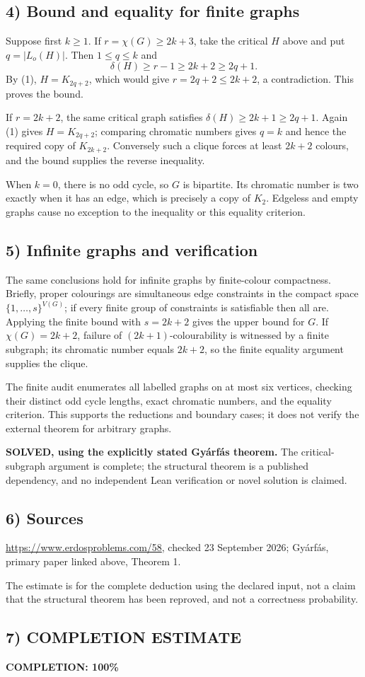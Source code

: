 \subsection*{4) Bound and equality for finite graphs}
Suppose first $k\ge1$. If $r=\chi(G)\ge2k+3$, take the critical $H$ above and put $q=|L_o(H)|$. Then $1\le q\le k$ and
\[
 \delta(H)\ge r-1\ge2k+2\ge2q+1.
\]
By (1), $H=K_{2q+2}$, which would give $r=2q+2\le2k+2$, a contradiction. This proves the bound.

If $r=2k+2$, the same critical graph satisfies $\delta(H)\ge2k+1\ge2q+1$. Again (1) gives $H=K_{2q+2}$; comparing chromatic numbers gives $q=k$ and hence the required copy of $K_{2k+2}$. Conversely such a clique forces at least $2k+2$ colours, and the bound supplies the reverse inequality.

When $k=0$, there is no odd cycle, so $G$ is bipartite. Its chromatic number is two exactly when it has an edge, which is precisely a copy of $K_2$. Edgeless and empty graphs cause no exception to the inequality or this equality criterion.

\subsection*{5) Infinite graphs and verification}
The same conclusions hold for infinite graphs by finite-colour compactness. Briefly, proper colourings are simultaneous edge constraints in the compact space $\{1,\ldots,s\}^{V(G)}$; if every finite group of constraints is satisfiable then all are. Applying the finite bound with $s=2k+2$ gives the upper bound for $G$. If $\chi(G)=2k+2$, failure of $(2k+1)$-colourability is witnessed by a finite subgraph; its chromatic number equals $2k+2$, so the finite equality argument supplies the clique.

The finite audit enumerates all labelled graphs on at most six vertices, checking their distinct odd cycle lengths, exact chromatic numbers, and the equality criterion. This supports the reductions and boundary cases; it does not verify the external theorem for arbitrary graphs.

\textbf{SOLVED, using the explicitly stated Gy\'arf\'as theorem.} The critical-subgraph argument is complete; the structural theorem is a published dependency, and no independent Lean verification or novel solution is claimed.

\subsection*{6) Sources}
\url{https://www.erdosproblems.com/58}, checked 23 September 2026; Gy\'arf\'as, primary paper linked above, Theorem 1.

The estimate is for the complete deduction using the declared input, not a claim that the structural theorem has been reproved, and not a correctness probability.
\subsection*{7) COMPLETION ESTIMATE}
\textbf{COMPLETION: 100\%}
